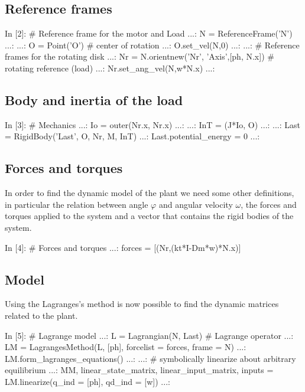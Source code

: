 \subsection{Reference frames}
\begin{code}
In [2]: # Reference frame for the motor and Load
   ...: N = ReferenceFrame('N')
   ...: 
   ...: O = Point('O')		# center of rotation
   ...: O.set_vel(N,0)
   ...: 
   ...: # Reference frames for the rotating disk
   ...: Nr = N.orientnew('Nr', 'Axis',[ph, N.x])    # rotating reference (load)
   ...: Nr.set_ang_vel(N,w*N.x)
   ...: 
\end{code}

\subsection{Body and inertia of the load}
\begin{code}
In [3]: # Mechanics
   ...: Io = outer(Nr.x, Nr.x)
   ...: 
   ...: InT = (J*Io, O)
   ...: 
   ...: Last = RigidBody('Last', O, Nr, M, InT)
   ...: Last.potential_energy = 0
   ...: 
\end{code}

\subsection{Forces and torques}
In order to find the dynamic model of the plant we need some other definitions, 
in particular the relation between angle $\varphi$ and angular velocity 
$\omega$, the forces and torques applied to the system and a vector that 
contains the rigid bodies of the system.

\begin{code}
In [4]: # Forces and torques
   ...: forces = [(Nr,(kt*I-Dm*w)*N.x)]
\end{code}

\subsection{Model}

Using the Lagranges's method is now possible to find the dynamic matrices related to the plant.

\begin{code}
In [5]: # Lagrange model
   ...: L = Lagrangian(N, Last)    # Lagrange operator
   ...: LM = LagrangesMethod(L, [ph], forcelist = forces, frame = N)
   ...: LM.form_lagranges_equations()
   ...: 
   ...: # symbolically linearize about arbitrary equilibrium
   ...: MM, linear_state_matrix, linear_input_matrix, inputs = LM.linearize(q_ind = [ph], qd_ind = [w])
   ...: 
\end{code}


